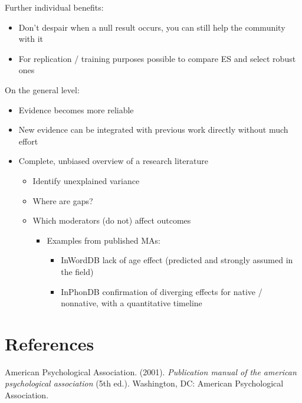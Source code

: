 \documentclass[english,floatsintext,man]{apa6}
\providecommand{\tightlist}{%
  \setlength{\itemsep}{0pt}\setlength{\parskip}{0pt}}
\begin{document}
Further individual benefits:

\begin{itemize}
\tightlist
\item
  Don't despair when a null result occurs, you can still help the
  community with it
\item
  For replication / training purposes possible to compare ES and select
  robust ones
\end{itemize}

On the general level:

\begin{itemize}
\tightlist
\item
  Evidence becomes more reliable
\item
  New evidence can be integrated with previous work directly without
  much effort
\item
  Complete, unbiased overview of a research literature

  \begin{itemize}
  \tightlist
  \item
    Identify unexplained variance
  \item
    Where are gaps?
  \item
    Which moderators (do not) affect outcomes

    \begin{itemize}
    \tightlist
    \item
      Examples from published MAs:

      \begin{itemize}
      \tightlist
      \item
        InWordDB lack of age effect (predicted and strongly assumed in
        the field)
      \item
        InPhonDB confirmation of diverging effects for native /
        nonnative, with a quantitative timeline
      \end{itemize}
    \end{itemize}
  \end{itemize}
\end{itemize}

\section*{References}\label{references}

\hypertarget{refs}{}
\hypertarget{ref-APA2001}{}
American Psychological Association. (2001). \emph{Publication manual of
the american psychological association} (5th ed.). Washington, DC:
American Psychological Association.
\end{document}
